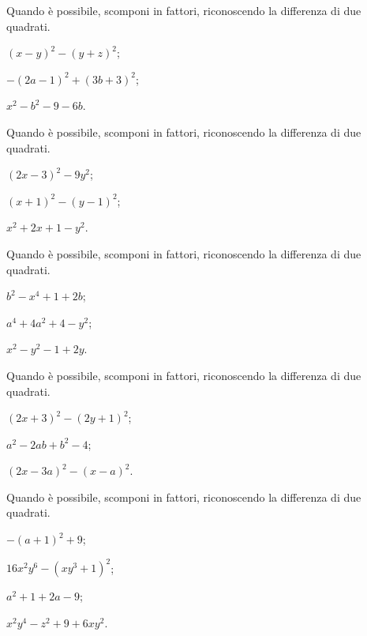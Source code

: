 \begin{multicols}{2}
\begin{esercizio}
\label{ese:16.36}
Quando è possibile, scomponi in fattori, riconoscendo la differenza di due quadrati.
\begin{enumeratea}
 \item $(x-y)^{2}-(y+z)^{2}$;
 \item $-(2a-1)^{2}+(3b+3)^{2}$;
 \item $x^{2}-b^{2}-9-6b$.
\end{enumeratea}
\end{esercizio}

\begin{esercizio}[\Ast]
\label{ese:16.37}
Quando è possibile, scomponi in fattori, riconoscendo la differenza di due quadrati.
\begin{enumeratea}
 \item $(2x-3)^{2}-9y^{2}$;
 \item $(x+1)^{2}-(y-1)^{2}$;
 \item $x^{2}+2x+1-y^{2}$.
\end{enumeratea}
\end{esercizio}

\begin{esercizio}
\label{ese:16.38}
Quando è possibile, scomponi in fattori, riconoscendo la differenza di due quadrati.
\begin{enumeratea}
 \item $b^{2}-x^{4}+1+2b$;
 \item $a^{4}+4a^{2}+4-y^{2}$;
 \item $x^{2}-y^{2}-1+2y$.
\end{enumeratea}
\end{esercizio}

\begin{esercizio}[\Ast]
\label{ese:16.39}
Quando è possibile, scomponi in fattori, riconoscendo la differenza di due quadrati.
\begin{enumeratea}
 \item $(2x+3)^{2}-(2y+1)^{2}$;
 \item $a^{2}-2{ab}+b^{2}-4$;
 \item $(2x-3a)^{2}-(x-a)^{2}$.
\end{enumeratea}
\end{esercizio}

\begin{esercizio}
\label{ese:16.40}
Quando è possibile, scomponi in fattori, riconoscendo la differenza di due quadrati.
\begin{enumeratea}
 \item $-(a+1)^{2}+9$;
 \item $16x^{2}y^{6}-(xy^{3}+1)^{2}$;
 \item $a^{2}+1+2a-9$;
 \item $x^{2}y^{4}-z^{2}+9+6xy^{2}$.
\end{enumeratea}
\end{esercizio}


\end{multicols}
